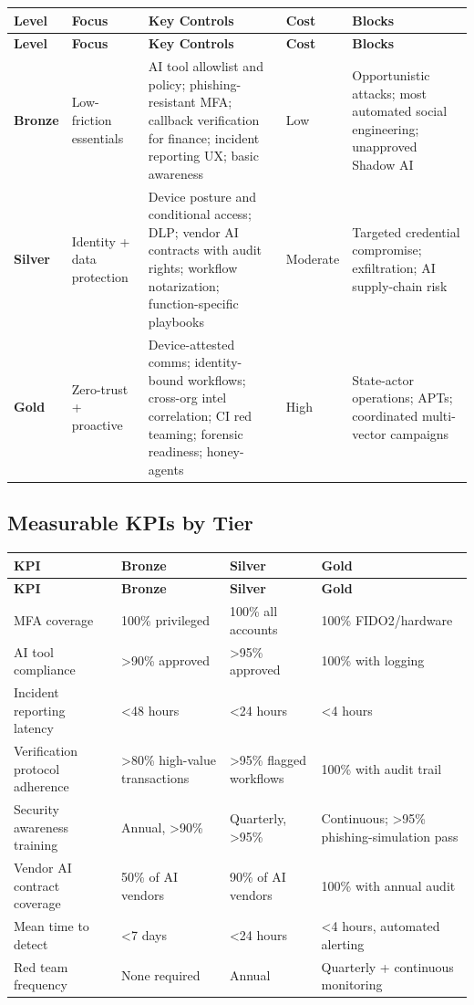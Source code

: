 \documentclass[11pt,letterpaper]{article}
\begin{document}
{\small
\begin{longtable}{L{1.4cm}L{2.2cm}L{5.8cm}L{1.6cm}L{4.1cm}}
\toprule
\textbf{Level} & \textbf{Focus} & \textbf{Key Controls} & \textbf{Cost} & \textbf{Blocks} \\
\midrule
\endfirsthead
\toprule
\textbf{Level} & \textbf{Focus} & \textbf{Key Controls} & \textbf{Cost} & \textbf{Blocks} \\
\midrule
\endhead
\textbf{Bronze} & Low-friction essentials & AI tool allowlist and policy; phishing-resistant MFA; callback verification for finance; incident reporting UX; basic awareness & Low & Opportunistic attacks; most automated social engineering; unapproved Shadow AI \\*
\textbf{Silver} & Identity + data protection & Device posture and conditional access; DLP; vendor AI contracts with audit rights; workflow notarization; function-specific playbooks & Moderate & Targeted credential compromise; exfiltration; AI supply-chain risk \\*
\textbf{Gold} & Zero-trust + proactive & Device-attested comms; identity-bound workflows; cross-org intel correlation; CI red teaming; forensic readiness; honey-agents & High & State-actor operations; APTs; coordinated multi-vector campaigns \\
\bottomrule
\end{longtable}}

\subsection{Measurable KPIs by Tier}

{\small
\begin{longtable}{L{4cm}L{3cm}L{3cm}L{3cm}}
\toprule
\textbf{KPI} & \textbf{Bronze} & \textbf{Silver} & \textbf{Gold} \\
\midrule
\endfirsthead
\toprule
\textbf{KPI} & \textbf{Bronze} & \textbf{Silver} & \textbf{Gold} \\
\midrule
\endhead
MFA coverage & 100\% privileged & 100\% all accounts & 100\% FIDO2/hardware \\*
AI tool compliance & >90\% approved & >95\% approved & 100\% with logging \\
Incident reporting latency & <48 hours & <24 hours & <4 hours \\
Verification protocol adherence & >80\% high-value transactions & >95\% flagged workflows & 100\% with audit trail \\
Security awareness training & Annual, >90\% & Quarterly, >95\% & Continuous; >95\% phishing-simulation pass \\
Vendor AI contract coverage & 50\% of AI vendors & 90\% of AI vendors & 100\% with annual audit \\
Mean time to detect & <7 days & <24 hours & <4 hours, automated alerting \\*
Red team frequency & None required & Annual & Quarterly + continuous monitoring \\
\bottomrule
\end{longtable}}
\end{document}
